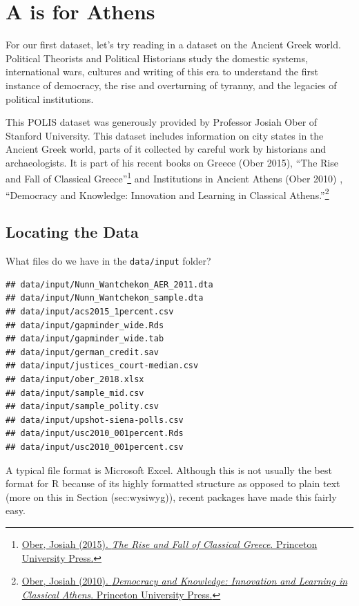 \documentclass[]{book}
\let\rmarkdownfootnote\footnote%
\def\footnote{\protect\rmarkdownfootnote}
\theoremstyle{definition}
\theoremstyle{definition}
\theoremstyle{definition}
\theoremstyle{remark}
\begin{document}
\section{A is for Athens}\label{a-is-for-athens}

For our first dataset, let's try reading in a dataset on the Ancient
Greek world. Political Theorists and Political Historians study the
domestic systems, international wars, cultures and writing of this era
to understand the first instance of democracy, the rise and overturning
of tyranny, and the legacies of political institutions.

This POLIS dataset was generously provided by Professor Josiah Ober of
Stanford University. This dataset includes information on city states in
the Ancient Greek world, parts of it collected by careful work by
historians and archaeologists. It is part of his recent books on Greece
(Ober 2015), ``The Rise and Fall of Classical Greece''\footnote{\href{https://press.princeton.edu/titles/10423.html}{Ober,
  Josiah (2015). \emph{The Rise and Fall of Classical Greece}. Princeton
  University Press.}} and Institutions in Ancient Athens (Ober 2010) ,
``Democracy and Knowledge: Innovation and Learning in Classical
Athens.''\footnote{\href{https://press.princeton.edu/titles/8742.html}{Ober,
  Josiah (2010). \emph{Democracy and Knowledge: Innovation and Learning
  in Classical Athens}. Princeton University Press.}}

\subsection{Locating the Data}\label{locating-the-data}

What files do we have in the \texttt{data/input} folder?

\begin{verbatim}
## data/input/Nunn_Wantchekon_AER_2011.dta
## data/input/Nunn_Wantchekon_sample.dta
## data/input/acs2015_1percent.csv
## data/input/gapminder_wide.Rds
## data/input/gapminder_wide.tab
## data/input/german_credit.sav
## data/input/justices_court-median.csv
## data/input/ober_2018.xlsx
## data/input/sample_mid.csv
## data/input/sample_polity.csv
## data/input/upshot-siena-polls.csv
## data/input/usc2010_001percent.Rds
## data/input/usc2010_001percent.csv
\end{verbatim}

A typical file format is Microsoft Excel. Although this is not usually
the best format for R because of its highly formatted structure as
opposed to plain text (more on this in Section (sec:wysiwyg)),
recent packages have made this fairly easy.
\end{document}
